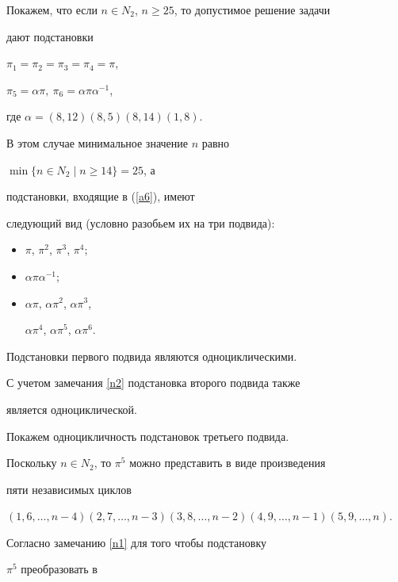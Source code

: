 \begin{pf}


Покажем, что если $n\in N_2$, $n\ge 25$, то допустимое решение задачи


дают подстановки


$\pi_1 = \pi_2 = \pi_3 =\pi_4 = \pi$,


$\pi_5 = \alpha \pi,\ \pi_6 = \alpha \pi \alpha^{-1}$,


где $\alpha=(8,12)(8,5)(8,14)(1,8)$.





В этом случае минимальное значение $n$ равно


$\min \{n\in N_2\mid n\ge 14\}=25$, а


подстановки, входящие в (\ref{a6}), имеют


следующий вид (условно разобьем их на три подвида):


\begin{itemize}


\item[I.] $\pi$, $\pi^2$, $\pi^3$, $\pi^4$;


\item[II.] $\alpha \pi \alpha^{-1}$;


\item[III.] $\alpha \pi$, $\alpha \pi^2$, $\alpha \pi^3$,


$\alpha \pi^4$, $\alpha \pi^5$, $\alpha \pi^6$.


\end{itemize}





Подстановки первого подвида являются одноциклическими.


С учетом замечания \ref{n2} подстановка второго подвида также


является одноциклической.





Покажем одноцикличность подстановок третьего подвида.


Поскольку $n\in N_2$, то $ \pi^5 $ можно представить в виде произведения


пяти независимых циклов


$(1,6,\dotsc,n-4)(2,7,\dotsc,n-3)


(3,8,\dotsc,n-2)(4,9,\dotsc,n-1)(5,9,\dotsc,n)$.


Согласно замечанию \ref{n1} для того чтобы подстановку


$\pi^5$ преобразовать в



\end{pf}
